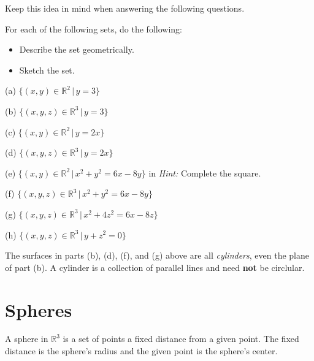 \documentclass{ximera}
\begin{document}
Keep this idea in mind when answering the following questions.

\begin{question} \label{Q1:Coordinates}
For each of the following sets, do the following:

\begin{itemize}
\item{Describe the set geometrically.}

\item{Sketch the set.}

\end{itemize}

(a) $\{  (x,y)\in \mathbb{R}^2 \, | \, y=3  \}$

(b) $\{  (x,y,z)\in \mathbb{R}^3 \, | \, y=3  \}$

(c) $\{  (x,y)\in \mathbb{R}^2 \, | \, y=2x  \}$

(d) $\{  (x,y,z)\in \mathbb{R}^3 \, | \, y=2x  \}$

(e) $\{  (x,y)\in \mathbb{R}^2 \, | \,  x^2 + y^2 = 6x - 8y  \}$   in {\it Hint:} Complete the square.

(f)  $\{  (x,y,z)\in \mathbb{R}^3 \, | \, x^2 + y^2 = 6x - 8y  \}$

(g) $\{  (x,y,z)\in \mathbb{R}^3 \, | \, x^2 +4z^2 = 6x - 8z  \}$

(h) $\{  (x,y,z)\in \mathbb{R}^3 \, | \, y+z^2= 0  \}$

\end{question}

The surfaces in parts (b), (d), (f), and (g) above are all \emph{cylinders}, even the plane of part (b). A cylinder is a collection of parallel lines and need {\bf not} be circlular.


\section{Spheres}
A sphere in $\mathbb{R}^3$ is a set of points a fixed distance from a given point. The fixed distance is the sphere's radius and the given point is the sphere's center.
\end{document}
